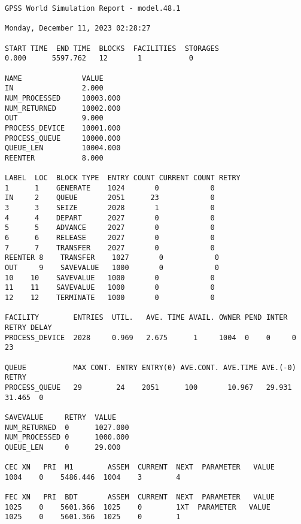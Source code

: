 \begin{lstlisting}[label=percent50,caption=Результат работы программы для процента возврата 50\%]
GPSS World Simulation Report - model.48.1

Monday, December 11, 2023 02:28:27  

START TIME  END TIME  BLOCKS  FACILITIES  STORAGES
0.000      5597.762   12       1           0

NAME              VALUE  
IN                2.000
NUM_PROCESSED     10003.000
NUM_RETURNED      10002.000
OUT               9.000
PROCESS_DEVICE    10001.000
PROCESS_QUEUE     10000.000
QUEUE_LEN         10004.000
REENTER           8.000

LABEL  LOC  BLOCK TYPE  ENTRY COUNT CURRENT COUNT RETRY
1      1    GENERATE    1024       0            0
IN     2    QUEUE       2051      23            0
3      3    SEIZE       2028       1            0
4      4    DEPART      2027       0            0
5      5    ADVANCE     2027       0            0
6      6    RELEASE     2027       0            0
7      7    TRANSFER    2027       0            0
REENTER 8    TRANSFER    1027       0            0
OUT     9    SAVEVALUE   1000       0            0
10    10    SAVEVALUE   1000       0            0
11    11    SAVEVALUE   1000       0            0
12    12    TERMINATE   1000       0            0

FACILITY        ENTRIES  UTIL.   AVE. TIME AVAIL. OWNER PEND INTER RETRY DELAY
PROCESS_DEVICE  2028     0.969   2.675      1     1004  0    0     0     23

QUEUE           MAX CONT. ENTRY ENTRY(0) AVE.CONT. AVE.TIME AVE.(-0) RETRY
PROCESS_QUEUE   29        24    2051      100       10.967   29.931    31.465  0

SAVEVALUE     RETRY  VALUE
NUM_RETURNED  0      1027.000                            
NUM_PROCESSED 0      1000.000                            
QUEUE_LEN     0      29.000                            

CEC XN   PRI  M1        ASSEM  CURRENT  NEXT  PARAMETER   VALUE
1004    0    5486.446  1004    3        4

FEC XN   PRI  BDT       ASSEM  CURRENT  NEXT  PARAMETER   VALUE
1025    0    5601.366  1025    0        1XT  PARAMETER   VALUE
1025    0    5601.366  1025    0        1
\end{lstlisting}

